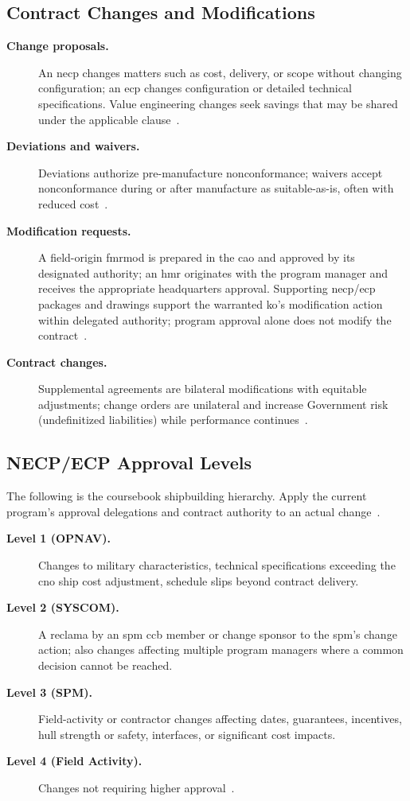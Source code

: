 \documentclass[../main.tex]{subfiles}
\begin{document}
\subsection{Contract Changes and Modifications}
\begin{description}
  \item[\textbf{Change proposals.}] An \ac{necp} changes matters such as cost, delivery, or scope without changing configuration; an \ac{ecp} changes configuration or detailed technical specifications. Value engineering changes seek savings that may be shared under the applicable clause~\autocite{edo-3-2-6-contract-administration-2025}.
  \item[\textbf{Deviations and waivers.}] Deviations authorize pre-manufacture nonconformance; waivers accept nonconformance during or after manufacture as suitable-as-is, often with reduced cost~\autocite{edo-3-2-6-contract-administration-2025}.
  \item[\textbf{Modification requests.}] A field-origin \ac{fmrmod} is prepared in the \ac{cao} and approved by its designated authority; an \ac{hmr} originates with the program manager and receives the appropriate headquarters approval. Supporting \ac{necp}/\ac{ecp} packages and drawings support the warranted \ac{ko}'s modification action within delegated authority; program approval alone does not modify the contract~\autocite{edo-3-2-6-contract-administration-2025}.
  \item[\textbf{Contract changes.}] Supplemental agreements are bilateral modifications with equitable adjustments; change orders are unilateral and increase Government risk (undefinitized liabilities) while performance continues~\autocite{edo-3-2-6-contract-administration-2025,FAR-43-103-Contract-Modifications}.
\end{description}

\subsection{NECP/ECP Approval Levels}
The following is the coursebook shipbuilding hierarchy. Apply the current program's approval delegations and contract authority to an actual change~\autocite{edo-3-2-6-contract-administration-2025}.
\begin{description}
  \item[\textbf{Level 1 (OPNAV).}] Changes to military characteristics, technical specifications exceeding the \ac{cno} ship cost adjustment, schedule slips beyond contract delivery.
  \item[\textbf{Level 2 (SYSCOM).}] A reclama by an \ac{spm} \ac{ccb} member or change sponsor to the \ac{spm}'s change action; also changes affecting multiple program managers where a common decision cannot be reached.
  \item[\textbf{Level 3 (SPM).}] Field-activity or contractor changes affecting dates, guarantees, incentives, hull strength or safety, interfaces, or significant cost impacts.
  \item[\textbf{Level 4 (Field Activity).}] Changes not requiring higher approval~\autocite{edo-3-2-6-contract-administration-2025}.
\end{description}
\end{document}
